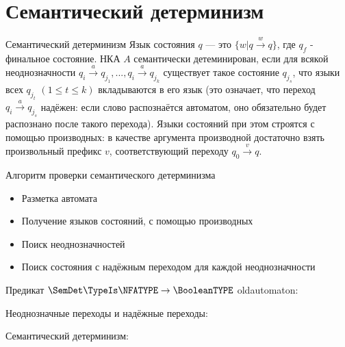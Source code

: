 \section{Семантический детерминизм}
\begin{frame}{Семантический детерминизм}
    \vspace{-5pt}
     Язык состояния $q$ — это $\{w | q \xrightarrow{\text{$w$}} q\}$, где $q_f$  - финальное состояние. НКА $A$ семантически детеминирован, если для всякой неоднозначности $q_i \xrightarrow{\text{$a$}} {q_{j_1}} , ..., {q_i \xrightarrow{\text{$a$}} q_{j_k}}$ существует такое состояние $q_{j_s}$, что языки всех  $q_{j_t}$ $(1 \leqslant t \leqslant k)$ вкладываются в его язык (это означает, что переход $q_i \xrightarrow{\text{$a$}} {q_{j_s}}$ надёжен: если слово распознаётся автоматом, оно обязательно будет распознано после такого перехода).
     Языки состояний при этом строятся с помощью производных: в качестве аргумента производной достаточно взять произвольный префикс $v$, соответствующий переходу $q_0 \xrightarrow{\text{$v$}} q$.
\end{frame}
\begin{frame}{Алгоритм проверки семантического детерминизма}
    \vspace{-5pt}
    \begin{itemize}
        \item Разметка автомата
        \item Получение языков состояний, с помощью производных
        \item Поиск неоднозначностей
        \item Поиск состояния с надёжным переходом для каждой неоднозначности
    \end{itemize}
    
\end{frame}
\begin{frame}{Предикат $\SemDet\TypeIs\NFATYPE\to\BooleanTYPE$}
    \vspace{-5pt}
	oldautomaton:


    Неоднозначные переходы и надёжные переходы:



    Семантический детерминизм:

\end{frame}